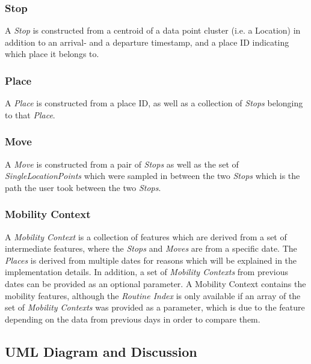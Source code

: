 \subsubsection*{Stop}
A \textit{Stop} is constructed from a centroid of a data point cluster (i.e. a Location) in addition to an arrival- and a departure timestamp, and a place ID indicating which place it belongs to.

\subsubsection*{Place}
A \textit{Place} is constructed from a place ID, as well as a collection of \textit{Stops} belonging to that \textit{Place}. 

\subsubsection*{Move}
A \textit{Move} is constructed from a pair of \textit{Stops} as well as the set of \textit{SingleLocationPoints} which were sampled in between the two \textit{Stops} which is the path the user took between the two \textit{Stops}.

\subsubsection*{Mobility Context}
A \textit{Mobility Context} is a collection of features which are derived from a set of intermediate features, where the \textit{Stops} and \textit{Moves} are from a specific date. The \textit{Places} is derived from multiple dates for reasons which will be explained in the implementation details. In addition, a set of \textit{Mobility Contexts} from previous dates can be provided as an optional parameter. A Mobility Context contains the mobility features, although the \textit{Routine Index} is only available if an array of the set of \textit{Mobility Contexts} was provided as a parameter, which is due to the feature depending on the data from previous days in order to compare them.

\subsection{UML Diagram and Discussion}

